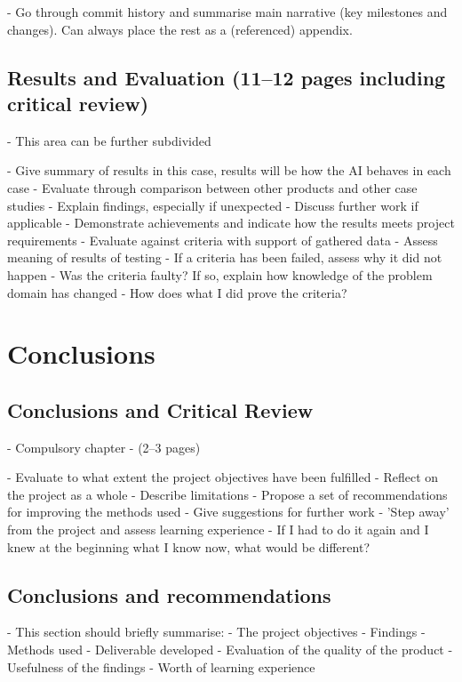 \documentclass[11pt, a4paper]{report}
\begin{document}
- Go through commit history and summarise main narrative (key milestones and changes). Can always place the rest as a (referenced) appendix.

\section{Results and Evaluation (11--12 pages including critical review)}
\label{sec:resultsAndEvaluation}

- This area can be further subdivided

- Give summary of results in this case, results will be how the AI behaves in each case
  - Evaluate through comparison between other products and other case studies
  - Explain findings, especially if unexpected
 - Discuss further work if applicable
- Demonstrate achievements and indicate how the results meets project requirements
  - Evaluate against criteria with support of gathered data
  - Assess meaning of results of testing 
    - If a criteria has been failed, assess why it did not happen 
      - Was the criteria faulty? If so, explain how knowledge of the problem domain has changed
    - How does what I did prove the criteria?

\chapter{Conclusions}
\label{chapter:conclusions}

\section{Conclusions and Critical Review}
\label{sec:conclusionsAndCriticalReview}

- Compulsory chapter
- (2--3 pages)

- Evaluate to what extent the project objectives have been fulfilled 
- Reflect on the project as a whole 
- Describe limitations 
  - Propose a set of recommendations for improving the methods used
  - Give suggestions for further work
- 'Step away' from the project and assess learning experience
  - If I had to do it again and I knew at the beginning what I know now, what would be different?

\section{Conclusions and recommendations}
\label{sec:conclusionsAndRecommendations}

- This section should briefly summarise:
  - The project objectives
  - Findings
  - Methods used 
  - Deliverable developed
  - Evaluation of the quality of the product
  - Usefulness of the findings
  - Worth of learning experience

\printbibliography[
  heading=bibintoc,
  title={Bibliography}
]
\end{document}
